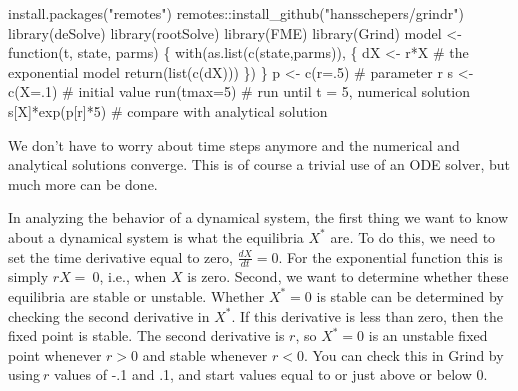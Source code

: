 \documentclass[
  a4paper,
  DIV=11,
  numbers=noendperiod]{scrreprt}
\newenvironment{Shaded}{\begin{snugshade}}{\end{snugshade}}
\newcommand{\AttributeTok}[1]{\textcolor[rgb]{0.40,0.45,0.13}{#1}}
\newcommand{\CommentTok}[1]{\textcolor[rgb]{0.37,0.37,0.37}{#1}}
\newcommand{\ControlFlowTok}[1]{\textcolor[rgb]{0.00,0.23,0.31}{#1}}
\newcommand{\DecValTok}[1]{\textcolor[rgb]{0.68,0.00,0.00}{#1}}
\newcommand{\FunctionTok}[1]{\textcolor[rgb]{0.28,0.35,0.67}{#1}}
\newcommand{\NormalTok}[1]{\textcolor[rgb]{0.00,0.23,0.31}{#1}}
\newcommand{\OtherTok}[1]{\textcolor[rgb]{0.00,0.23,0.31}{#1}}
\newcommand{\SpecialCharTok}[1]{\textcolor[rgb]{0.37,0.37,0.37}{#1}}
\newcommand{\StringTok}[1]{\textcolor[rgb]{0.13,0.47,0.30}{#1}}
\begin{document}
\begin{Shaded}
\begin{Highlighting}[]
\FunctionTok{install.packages}\NormalTok{(}\StringTok{"remotes"}\NormalTok{)}
\NormalTok{remotes}\SpecialCharTok{::}\FunctionTok{install\_github}\NormalTok{(}\StringTok{"hansschepers/grindr"}\NormalTok{)}
\FunctionTok{library}\NormalTok{(deSolve)}
\FunctionTok{library}\NormalTok{(rootSolve)}
\FunctionTok{library}\NormalTok{(FME)}
\FunctionTok{library}\NormalTok{(Grind)}
\NormalTok{model }\OtherTok{\textless{}{-}} \ControlFlowTok{function}\NormalTok{(t, state, parms) \{}
  \FunctionTok{with}\NormalTok{(}\FunctionTok{as.list}\NormalTok{(}\FunctionTok{c}\NormalTok{(state,parms)), \{}
\NormalTok{    dX }\OtherTok{\textless{}{-}}\NormalTok{ r}\SpecialCharTok{*}\NormalTok{X            }\CommentTok{\# the exponential model}
      \FunctionTok{return}\NormalTok{(}\FunctionTok{list}\NormalTok{(}\FunctionTok{c}\NormalTok{(dX)))}
\NormalTok{  \})}
\NormalTok{\}}
\NormalTok{p }\OtherTok{\textless{}{-}} \FunctionTok{c}\NormalTok{(}\AttributeTok{r=}\NormalTok{.}\DecValTok{5}\NormalTok{) }\CommentTok{\# parameter r}
\NormalTok{s }\OtherTok{\textless{}{-}} \FunctionTok{c}\NormalTok{(}\AttributeTok{X=}\NormalTok{.}\DecValTok{1}\NormalTok{) }\CommentTok{\# initial value}
\FunctionTok{run}\NormalTok{(}\AttributeTok{tmax=}\DecValTok{5}\NormalTok{) }\CommentTok{\# run until t = 5, numerical solution}
\NormalTok{s[}\StringTok{\textquotesingle{}X\textquotesingle{}}\NormalTok{]}\SpecialCharTok{*}\FunctionTok{exp}\NormalTok{(p[}\StringTok{\textquotesingle{}r\textquotesingle{}}\NormalTok{]}\SpecialCharTok{*}\DecValTok{5}\NormalTok{) }\CommentTok{\# compare with analytical solution}
\end{Highlighting}
\end{Shaded}

We don't have to worry about time steps anymore and the numerical and
analytical solutions converge. This is of course a trivial use of an ODE
solver, but much more can be done.

In analyzing the behavior of a dynamical system, the first thing we want
to know about a dynamical system is what the equilibria \(X^{*}\)
are\emph{.} To do this, we need to set the time derivative equal to
zero, \(\frac{dX}{dt} = 0\). For the exponential function this is simply
\(rX = \ 0\), i.e., when \(X\) is zero. Second, we want to determine
whether these equilibria are stable or unstable. Whether \(X^{*}=0\) is
stable can be determined by checking the second derivative in \(X^{*}\).
If this derivative is less than zero, then the fixed point is stable.
The second derivative is \(r\), so \(X^{*} = 0\) is an unstable fixed
point whenever \(r > 0\) and stable whenever \(r < 0\). You can check
this in Grind by using\(\ r\) values of -.1 and .1, and start values
equal to or just above or below 0.
\end{document}

